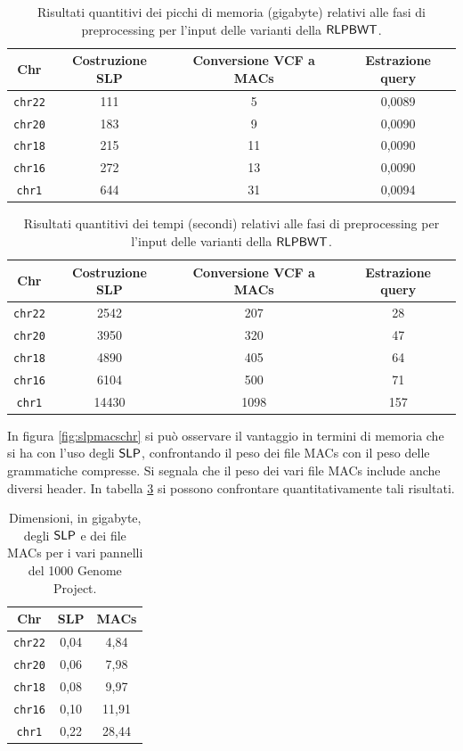 \begin{table}
  \centering
  \small
  \caption{Risultati quantitivi dei picchi di memoria (gigabyte) relativi alle
    fasi di 
    preprocessing per l'input delle varianti della $\mbox{\rm {\sf RLPBWT}}$.}
  \label{tab:prepmem}
  \begin{tabular}{c||c|c|c}
    \textbf{Chr} & \textbf{Costruzione SLP} & \textbf{Conversione VCF a MACs}
    & \textbf{Estrazione query}\\
    \hline
    \hline
    \texttt{chr22} & 111 & 5 & 0,0089  \\
    \texttt{chr20} & 183 & 9 & 0,0090 \\
    \texttt{chr18} & 215 & 11 & 0,0090 \\
    \texttt{chr16} & 272 & 13 & 0,0090 \\
    \texttt{chr1} & 644 & 31 & 0,0094 
  \end{tabular}
\end{table}
\begin{table}
  \centering
  \small
  \caption{Risultati quantitivi dei tempi (secondi) relativi alle fasi di
    preprocessing per l'input delle varianti della $\mbox{\rm {\sf RLPBWT}}$.}
  \label{tab:preptime}
  \begin{tabular}{c||c|c|c}
    \textbf{Chr} & \textbf{Costruzione SLP} & \textbf{Conversione VCF a MACs}
    & \textbf{Estrazione query}\\
    \hline
    \hline
    \texttt{chr22} & 2542 & 207 & 28 \\
    \texttt{chr20} & 3950 & 320 & 47 \\
    \texttt{chr18} & 4890 & 405 & 64 \\
    \texttt{chr16} & 6104 & 500 & 71 \\
    \texttt{chr1} & 14430 & 1098 & 157
  \end{tabular}
\end{table}
In figura \ref{fig:slpmacschr} si può osservare il vantaggio in termini di
memoria che si ha con l'uso degli $\mbox{\rm {\sf SLP}}$, confrontando il peso dei file
MACs con il peso delle grammatiche compresse. Si segnala che il
peso dei vari file MACs include anche diversi header. In tabella
\ref{tab:slpmacs} si possono
confrontare quantitativamente tali risultati.
\begin{table}
  \centering
  \caption{Dimensioni, in gigabyte, degli $\mbox{\rm {\sf SLP}}$ e dei file MACs
  per i vari pannelli del 1000 Genome Project.}
  \begin{tabular}{c||c|c}
    \textbf{Chr} & \textbf{SLP}
    & \textbf{MACs} \\
    \hline
    \hline
    \texttt{chr22} & 0,04 & 4,84\\
    \texttt{chr20} & 0,06 & 7,98\\
    \texttt{chr18} & 0,08 & 9,97\\
    \texttt{chr16} & 0,10 & 11,91\\
    \texttt{chr1} & 0,22 & 28,44\\
  \end{tabular}
  \label{tab:slpmacs}
\end{table}

